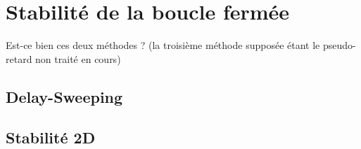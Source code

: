 	\section{Stabilité de la boucle fermée}
	Est-ce bien ces deux méthodes ? (la troisième méthode supposée étant le pseudo-retard non traité en cours)
		\subsection{Delay-Sweeping}
		\subsection{Stabilité 2D}


